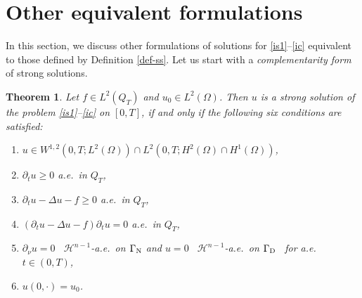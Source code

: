 \documentclass[reqno,10pt]{amsart}
\newtheorem{Th}{Theorem}[section]
\begin{document}
\section{Other equivalent formulations}\label{od}

In this section, we discuss other formulations of solutions for
\eqref{is1}--\eqref{ic} equivalent to those defined by Definition
\ref{def-ss}. Let us start with a \emph{complementarity form} of strong
solutions.

\begin{Th}\label{th-ws}
Let $f\in L^2(Q_T)$ and $u_0\in L^2(\Omega)$.
Then $u$ is a strong solution of the problem \eqref{is1}--\eqref{ic} on
 $[0,T]$, if and only if the following six conditions are satisfied\/{\rm :}
\begin{enumerate}[{\rm (V1)}]
\item
$u\in W^{1,2}(0,T;L^2(\Omega)) \cap
L^2(0,T;H^2(\Omega)\cap H^1(\Omega))$,
\item
$\partial_t u \ge 0$
a.e.~in $Q_T$,
\item
$\partial_t u -\Delta u-f
\ge 0$ a.e.~in $Q_T$,
\item
$\left(\partial_t u -\Delta u-f\right)
 \partial_t u =0$ a.e.~in $Q_T$,
\item
$\partial_\nu u = 0$ \ ${{\mathcal H}}^{n-1}$-a.e.~on ${{\Gamma_{\rm\scriptsize N}}}$ and $u = 0$ \
     ${{\mathcal H}}^{n-1}$-a.e.~on ${{\Gamma_{\rm\scriptsize D}}}$ \ for a.e.~$t \in (0,T)$,
\item
$u(0,\cdot)=u_0$.
\end{enumerate}
\end{Th}
\end{document}
